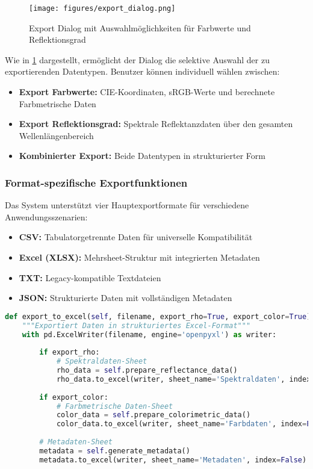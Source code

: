 \begin{figure}[H]
    \centering
\texttt{[image: figures/export\_dialog.png]}
\caption{Export Dialog mit Auswahlmöglichkeiten für Farbwerte und Reflektionsgrad}
\label{fig:export_dialog}
\end{figure}

Wie in \ref{fig:export_dialog} dargestellt, ermöglicht der Dialog die selektive Auswahl der zu exportierenden Datentypen. Benutzer können individuell wählen zwischen:

\begin{itemize}
    \item \textbf{Export Farbwerte:} CIE-Koordinaten, sRGB-Werte und berechnete Farbmetrische Daten
    \item \textbf{Export Reflektionsgrad:} Spektrale Reflektanzdaten über den gesamten Wellenlängenbereich
    \item \textbf{Kombinierter Export:} Beide Datentypen in strukturierter Form
\end{itemize}

\subsubsection{Format-spezifische Exportfunktionen}

Das System unterstützt vier Hauptexportformate für verschiedene Anwendungsszenarien:

\begin{itemize}
    \item \textbf{CSV:} Tabulatorgetrennte Daten für universelle Kompatibilität
    \item \textbf{Excel (XLSX):} Mehrsheet-Struktur mit integrierten Metadaten
    \item \textbf{TXT:} Legacy-kompatible Textdateien
    \item \textbf{JSON:} Strukturierte Daten mit vollständigen Metadaten
\end{itemize}

\begin{lstlisting}[language=Python, caption=Excel-Export mit Metadaten-Integration]
def export_to_excel(self, filename, export_rho=True, export_color=True):
    """Exportiert Daten in strukturiertes Excel-Format"""
    with pd.ExcelWriter(filename, engine='openpyxl') as writer:
        
        if export_rho:
            # Spektraldaten-Sheet
            rho_data = self.prepare_reflectance_data()
            rho_data.to_excel(writer, sheet_name='Spektraldaten', index=False)
        
        if export_color:
            # Farbmetrische Daten-Sheet
            color_data = self.prepare_colorimetric_data()
            color_data.to_excel(writer, sheet_name='Farbdaten', index=False)
        
        # Metadaten-Sheet
        metadata = self.generate_metadata()
        metadata.to_excel(writer, sheet_name='Metadaten', index=False)
\end{lstlisting}

